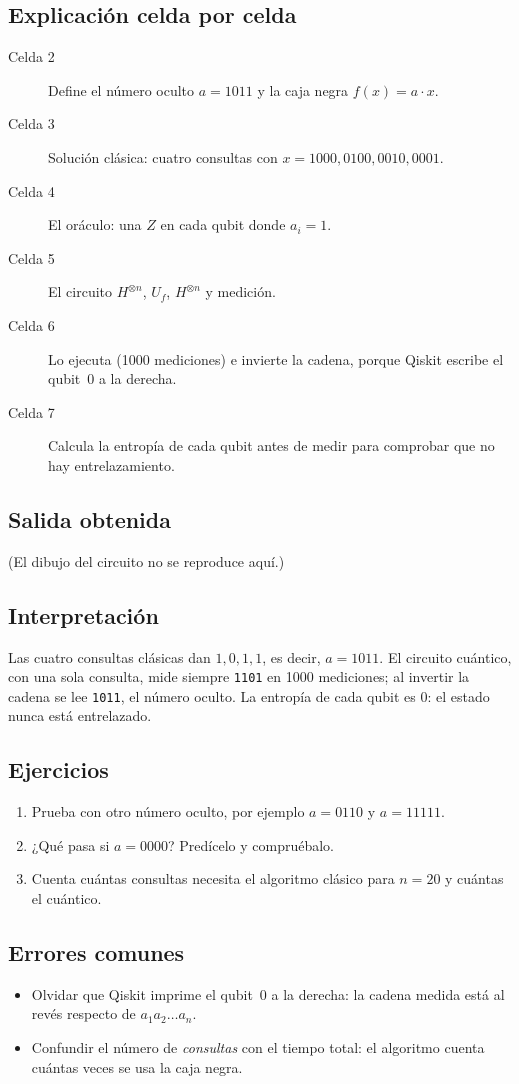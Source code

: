\subsection{Explicación celda por celda}
\begin{description}
  \item[Celda 2] Define el número oculto $a=1011$ y la caja negra $f(x)=a\cdot x$.
  \item[Celda 3] Solución clásica: cuatro consultas con $x=1000,0100,0010,0001$.
  \item[Celda 4] El oráculo: una $Z$ en cada qubit donde $a_i=1$.
  \item[Celda 5] El circuito $H^{\otimes n}$, $U_f$, $H^{\otimes n}$ y medición.
  \item[Celda 6] Lo ejecuta (1000 mediciones) e invierte la cadena, porque
    Qiskit escribe el qubit~0 a la derecha.
  \item[Celda 7] Calcula la entropía de cada qubit antes de medir para
    comprobar que no hay entrelazamiento.
\end{description}

\subsection{Salida obtenida}

(El dibujo del circuito no se reproduce aquí.)

\subsection{Interpretación}
Las cuatro consultas clásicas dan $1,0,1,1$, es decir, $a=1011$. El circuito
cuántico, con una sola consulta, mide siempre \texttt{1101} en 1000 mediciones;
al invertir la cadena se lee \texttt{1011}, el número oculto. La entropía de
cada qubit es $0$: el estado nunca está entrelazado.

\subsection{Ejercicios}
\begin{enumerate}
  \item Prueba con otro número oculto, por ejemplo $a=0110$ y $a=11111$.
  \item ¿Qué pasa si $a=0000$? Predícelo y compruébalo.
  \item Cuenta cuántas consultas necesita el algoritmo clásico para
    $n=20$ y cuántas el cuántico.
\end{enumerate}

\subsection{Errores comunes}
\begin{itemize}
  \item Olvidar que Qiskit imprime el qubit~0 a la derecha: la cadena
    medida está al revés respecto de $a_1a_2\ldots a_n$.
  \item Confundir el número de \emph{consultas} con el tiempo total: el
    algoritmo cuenta cuántas veces se usa la caja negra.
\end{itemize}


